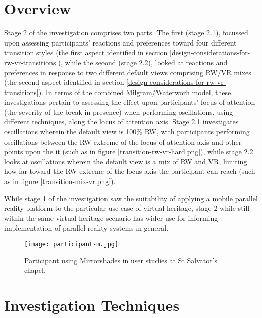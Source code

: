 
\section{Overview}

Stage 2 of the investigation comprises two parts. The first (stage 2.1), focussed upon assessing participants' reactions and preferences toward four different transition styles (the first aspect identified in section \ref{design-considerations-for-rw-vr-transitions}), while the second (stage 2.2), looked at reactions and preferences in response to two different default views comprising RW/VR mixes (the second aspect identified in section \ref{design-considerations-for-rw-vr-transitions}). In terms of the combined Milgram/Waterworh model, these investigations pertain to assessing the effect upon participants' focus of attention (the severity of the break in presence) when performing oscillations, using different techniques, along the locus of attention axis. Stage 2.1 investigates oscillations wherein the default view is 100\% RW, with participants performing oscillations between the RW extreme of the locus of attention axis and other points upon the it (such as in figure \ref{transition-rw-vr-hard.png}), while stage 2.2 looks at oscillations wherein the default view is a mix of RW and VR, limiting how far toward the RW extreme of the locus axis the participant can reach (such as in figure \ref{transition-mix-vr.png}).

While stage 1 of the investigation saw the suitability of applying a mobile parallel reality platform to the particular use case of virtual heritage, stage 2 while still within the same virtual heritage scenario has wider use for informing implementation of parallel reality systems in general.

\begin{figure}[ht]
	\begin{center}
		\texttt{[image: participant-m.jpg]}
		\caption{Participant using Mirrorshades in user studies at St Salvator's chapel.}
		\label{participant-m.jpg}
	\end{center}
\end{figure}


\section{Investigation Techniques}

